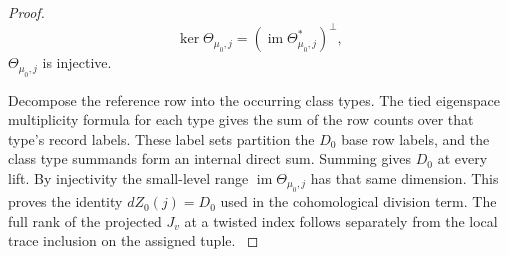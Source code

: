 \begin{proof}
\[
  \ker\Theta_{\mu_0,j}=(\operatorname{im}\Theta_{\mu_0,j}^*)^\perp,
\]
\(\Theta_{\mu_0,j}\) is injective.

Decompose the reference row into the occurring class types.
The tied eigenspace multiplicity formula for each type gives
the sum of the row counts over that type's record labels.
These label sets partition the \(D_0\) base row labels,
and the class type summands form an internal direct sum.
Summing gives \(D_0\) at every lift. By injectivity the
small-level range \(\operatorname{im}\Theta_{\mu_0,j}\)
has that same dimension. This proves the identity
\(dZ_0(j)=D_0\) used in the cohomological division term.
The full rank of the projected \(J_v\) at a twisted index
follows separately from the local trace inclusion on the
assigned tuple.
\label{cor:paired-row-reading-5}
\end{proof}
